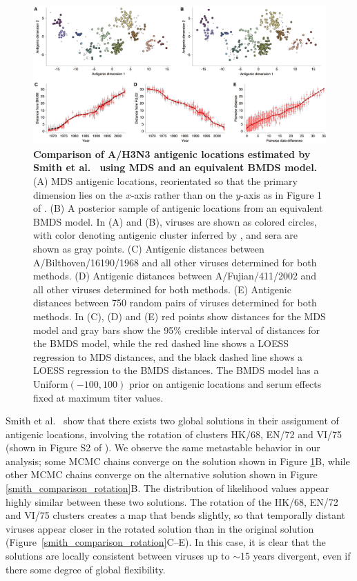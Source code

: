 \documentclass[11pt,oneside,letterpaper]{article}
\begin{document}
\begin{figure}[H]
	\centering		
	\includegraphics[width=1.0\textwidth]{figures/smith_comparison}
	\caption{\textbf{Comparison of A/H3N3 antigenic locations estimated by Smith et al.\ \cite{Smith04} using MDS and an equivalent BMDS model.} 
	(A) MDS antigenic locations, reorientated so that the primary dimension lies on the $x$-axis rather than on the $y$-axis as in Figure 1 of \cite{Smith04}.
	(B) A posterior sample of antigenic locations from an equivalent BMDS model.
	In (A) and (B), viruses are shown as colored circles, with color denoting antigenic cluster inferred by \cite{Smith04}, and sera are shown as gray points.
	(C) Antigenic distances between A/Bilthoven/16190/1968 and all other viruses determined for both methods.
	(D) Antigenic distances between A/Fujian/411/2002 and all other viruses determined for both methods.
	(E) Antigenic distances between 750 random pairs of viruses determined for both methods.	
	In (C), (D) and (E) red points show distances for the MDS model and gray bars show the 95\% credible interval of distances for the BMDS model, while the red dashed line shows a LOESS regression to MDS distances, and the black dashed line shows a LOESS regression to the BMDS distances.
	The BMDS model has a Uniform$(-100,100)$ prior on antigenic locations and serum effects fixed at maximum titer values. 
	} 
	\label{smith_comparison} 
\end{figure}

Smith et al.\ \cite{Smith04} show that there exists two global solutions in their assignment of antigenic locations, involving the rotation of clusters HK/68, EN/72 and VI/75 (shown in Figure S2 of \cite{Smith04}).
We observe the same metastable behavior in our analysis; some MCMC chains converge on the solution shown in Figure \ref{smith_comparison}B, while other MCMC chains converge on the alternative solution shown in Figure \ref{smith_comparison_rotation}B.
The distribution of likelihood values appear highly similar between these two solutions.
The rotation of the HK/68, EN/72 and VI/75 clusters creates a map that bends slightly, so that temporally distant viruses appear closer in the rotated solution than in the original solution (Figure~\ref{smith_comparison_rotation}C--E).
In this case, it is clear that the solutions are locally consistent between viruses up to $\sim$15 years divergent, even if there some degree of global flexibility.
\end{document}
